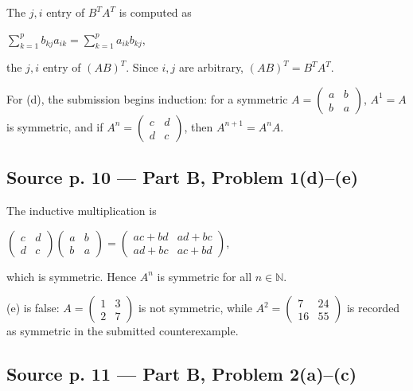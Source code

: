 The \(j,i\) entry of \(B^{T}A^{T}\) is computed as

\(\sum_{k = 1}^{p}b_{kj}a_{ik} = \sum_{k = 1}^{p}a_{ik}b_{kj}\),

the \(j,i\) entry of \(\left( {AB} \right)^{T}\). Since \(i,j\) are arbitrary, \(\left( {AB} \right)^{T} = B^{T}A^{T}\).

For (d), the submission begins induction: for a symmetric \(A = \begin{pmatrix}
a & b \\
b & a
\end{pmatrix}\), \(A^{1} = A\) is symmetric, and if \(A^{n} = \begin{pmatrix}
c & d \\
d & c
\end{pmatrix}\), then \(A^{n + 1} = A^{n}A\).

\subsection{Source p. 10 --- Part B, Problem 1(d)--(e)}

The inductive multiplication is

\(\begin{pmatrix}
c & d \\
d & c
\end{pmatrix}\begin{pmatrix}
a & b \\
b & a
\end{pmatrix} = \begin{pmatrix}
{ac + bd} & {ad + bc} \\
{ad + bc} & {ac + bd}
\end{pmatrix}\),

which is symmetric. Hence \(A^{n}\) is symmetric for all \(n \in \mathbb{N}\).

(e) is false: \(A = \begin{pmatrix}
1 & 3 \\
2 & 7
\end{pmatrix}\) is not symmetric, while \(A^{2} = \begin{pmatrix}
7 & 24 \\
16 & 55
\end{pmatrix}\) is recorded as symmetric in the submitted counterexample.

\subsection{Source p. 11 --- Part B, Problem 2(a)--(c)}

